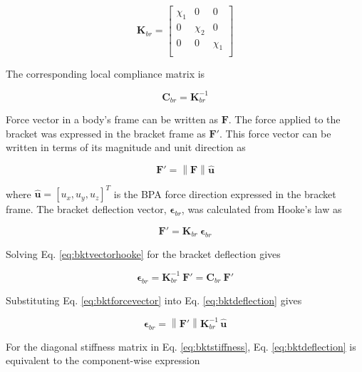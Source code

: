 \begin{equation}
\mathbf{K}_{br} = 
\begin{bmatrix}
\chi_{1} & 0   & 0 \\
0   & \chi_{2} & 0 \\
0   & 0   & \chi_{1} \\
\end{bmatrix}
\label{eq:bktstiffness}
\end{equation}

The corresponding local compliance matrix is 

\begin{equation}
\mathbf{C}_{br} = \mathbf{K}_{br}^{-1}
\label{eq:bktcompliance}
\end{equation}

Force vector in a body's frame can be written as $\mathbf{F}$. The force applied to the bracket was expressed in the bracket frame as $\mathbf{F}'$. This force vector can be written in terms of its magnitude and unit direction as

\begin{equation}
\mathbf{F}' = \left\| \mathbf{F} \right\| \hat{\mathbf{u}}
\label{eq:bktforcevector}
\end{equation}

where $\hat{\mathbf{u}} = [u_{x}, u_{y}, u_{z}]^{T}$ is the BPA force direction expressed in the bracket frame. The bracket deflection vector, $\boldsymbol{\epsilon}_{br}$, was calculated from Hooke's law as 

\begin{equation} \mathbf{F}' = \mathbf{K}_{br} \: \boldsymbol{\epsilon}_{br}
\label{eq:bktvectorhooke}
\end{equation}

Solving Eq. \ref{eq:bktvectorhooke} for the bracket deflection gives

\begin{equation}
\boldsymbol{\epsilon}_{br} = \mathbf{K}_{br}^{-1} \: \mathbf{F}' = \mathbf{C}_{br} \: \mathbf{F}'
\label{eq:bktdeflection}
\end{equation}

Substituting Eq. \ref{eq:bktforcevector} into Eq. \ref{eq:bktdeflection} gives

\begin{equation}
\boldsymbol{\epsilon}_{br} = \left\| \mathbf{F}' \right\| \mathbf{K}_{br}^{-1} \,\hat{\mathbf{u}}
\label{eq:bktdeflectionforceunit}
\end{equation}

For the diagonal stiffness matrix in Eq. \ref{eq:bktstiffness}, Eq. \ref{eq:bktdeflection} is equivalent to the component-wise expression

